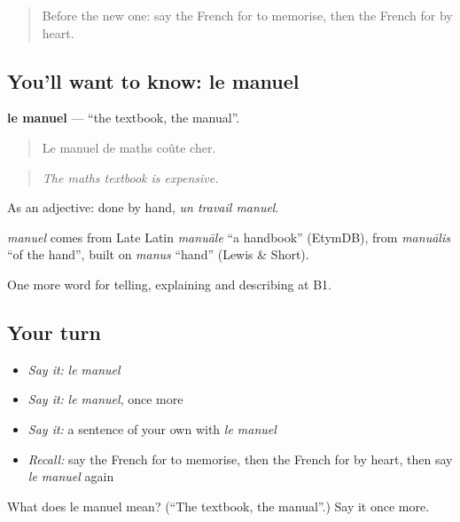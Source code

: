 \label{lesson:FR-C377-manuel}



\begin{quote}
Before the new one: say the French for to memorise, then the French for by heart.
\end{quote}

\subsection*{You'll want to know: le manuel}
\textbf{le manuel} — \textquotedblleft{}the textbook, the manual\textquotedblright{}.

\begin{quote}
Le manuel de maths coûte cher.
\end{quote}

\begin{quote}
\emph{The maths textbook is expensive.}
\end{quote}

As an adjective: done by hand, \emph{un travail manuel}.

\begin{cousinweb}
\emph{manuel} comes from Late Latin \emph{manuāle} \textquotedblleft{}a handbook\textquotedblright{} (EtymDB), from \emph{manuālis} \textquotedblleft{}of the hand\textquotedblright{}, built on \emph{manus} \textquotedblleft{}hand\textquotedblright{} (Lewis \& Short).
\end{cousinweb}

\begin{grammarlens}[title={What you've built}]
One more word for telling, explaining and describing at B1.
\end{grammarlens}

\subsection*{Your turn}
\begin{itemize}
\raggedright
  \item \emph{Say it:} \emph{le manuel}
  \item \emph{Say it:} \emph{le manuel}, once more
  \item \emph{Say it:} a sentence of your own with \emph{le manuel}
  \item \emph{Recall:} say the French for to memorise, then the French for by heart, then say \emph{le manuel} again
\end{itemize}

\begin{tcolorbox}[breakable,colback=teal!4,colframe=teal!35!black,title={Before you move on}]
What does le manuel mean? (\textquotedblleft{}The textbook, the manual\textquotedblright{}.) Say it once more.
\end{tcolorbox}
